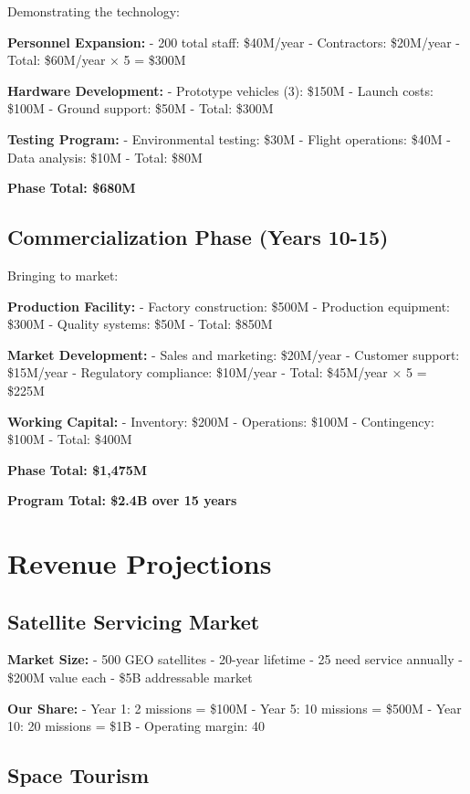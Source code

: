 \documentclass[12pt,letterpaper]{book}
\theoremstyle{definition}
\theoremstyle{plain}
\theoremstyle{remark}
\begin{document}
{{{{{Demonstrating the technology:

\textbf{Personnel Expansion:}
- 200 total staff: \$40M/year
- Contractors: \$20M/year
- Total: \$60M/year × 5 = \$300M

\textbf{Hardware Development:}
- Prototype vehicles (3): \$150M
- Launch costs: \$100M
- Ground support: \$50M
- Total: \$300M

\textbf{Testing Program:}
- Environmental testing: \$30M
- Flight operations: \$40M
- Data analysis: \$10M
- Total: \$80M

\textbf{Phase Total: \$680M}

\subsection{Commercialization Phase (Years 10-15)}

Bringing to market:

\textbf{Production Facility:}
- Factory construction: \$500M
- Production equipment: \$300M
- Quality systems: \$50M
- Total: \$850M

\textbf{Market Development:}
- Sales and marketing: \$20M/year
- Customer support: \$15M/year
- Regulatory compliance: \$10M/year
- Total: \$45M/year × 5 = \$225M

\textbf{Working Capital:}
- Inventory: \$200M
- Operations: \$100M
- Contingency: \$100M
- Total: \$400M

\textbf{Phase Total: \$1,475M}

\textbf{Program Total: \$2.4B over 15 years}

\section{Revenue Projections}

\subsection{Satellite Servicing Market}

\textbf{Market Size:}
- 500 GEO satellites
- 20-year lifetime
- 25 need service annually
- \$200M value each
- \$5B addressable market

\textbf{Our Share:}
- Year 1: 2 missions = \$100M
- Year 5: 10 missions = \$500M
- Year 10: 20 missions = \$1B
- Operating margin: 40%

\subsection{Space Tourism}

}}}}}
\end{document}
